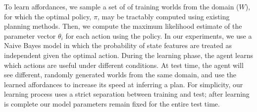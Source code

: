 

To learn affordances, we sample a set of of training worlds from the
domain ($W$), for which the optimal policy, $\pi$, may be tractably
computed using existing planning methods. Then, we compute the maximum
likelihood estimate of the parameter vector $\theta_i$ for each action
using the policy. In our experiments, we use a Naive Bayes model
in which the probability of state features are treated as independent given
the optimal action.
During the learning phase, the agent learns which
actions are useful under different conditions. At test time, the agent
will see different, randomly generated worlds from the same domain,
and use the learned affordances to increase its speed at inferring a
plan. 
For simplicity, our learning process uses a strict separation
between training and test; after learning is complete our model
parameters remain fixed for the entire test time. 

